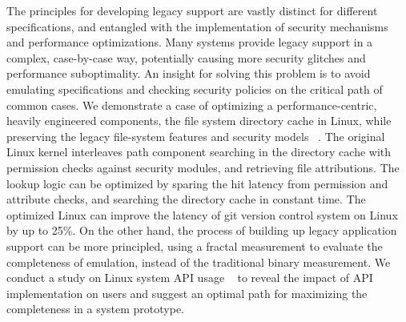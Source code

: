 The principles for developing legacy support are vastly distinct
for different specifications,
and entangled with the implementation of
security mechanisms and performance optimizations.
Many systems provide legacy support
in a complex, case-by-case way,
potentially causing more security glitches and performance suboptimality.
An insight
for solving this problem %
is to avoid
emulating specifications and checking security policies
on the critical path of common cases.
We demonstrate a case of optimizing a performance-centric, heavily engineered components,
the file system directory cache in Linux,
while preserving the legacy file-system features and security models
~\citep{tsai15dcache}.
The original Linux kernel interleaves path component searching
in the directory cache
with permission checks against security modules,
and retrieving file attributions.
The lookup logic can be optimized
by sparing the hit latency from permission and attribute checks,
and searching the directory cache in constant time.
The optimized Linux
can improve the latency of git version control system on Linux by up to 25\%.
On the other hand,
the process of building up legacy application support
can be more principled,
using a fractal measurement to evaluate the completeness of emulation,
instead of the traditional binary measurement.
%
We conduct a study on Linux system API usage
~\citep{tsai16apistudy}
to reveal the impact of API implementation on users
and suggest an optimal path for maximizing the completeness in a system prototype.



